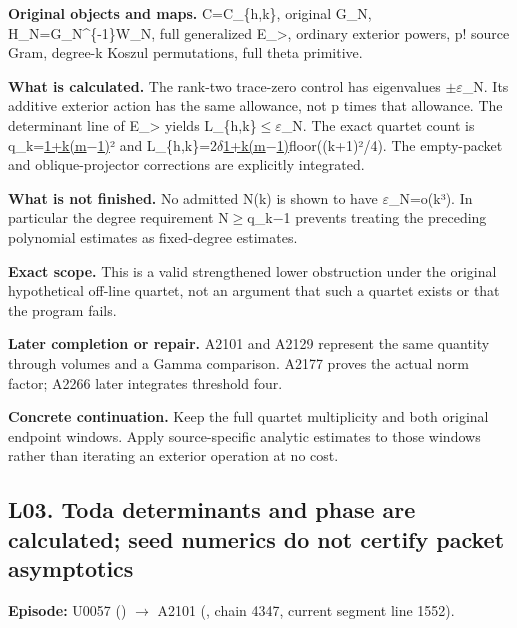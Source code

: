 \textbf{Original objects and maps.} C=C\_\{h,k\}, original G\_N,
H\_N=G\_N\^{}\{-1\}W\_N, full generalized E\_\textgreater, ordinary
exterior powers, p! source Gram, degree-k Koszul permutations, full
theta primitive.

\textbf{What is calculated.} The rank-two trace-zero control has
eigenvalues
\allowbreak{}\ensuremath{±}\allowbreak{}\allowbreak{}\ensuremath{ε}\allowbreak{}\_N.
Its additive exterior action has the same allowance, not p times that
allowance. The determinant line of E\_\textgreater{} yields
L\_\{h,k\}\allowbreak{}\ensuremath{≤}\allowbreak{}\allowbreak{}\ensuremath{ε}\allowbreak{}\_N.
The exact quartet count is
q\_k=\href{k+1}{1+k(m\allowbreak{}\ensuremath{−}\allowbreak{}1)}² and
L\_\{h,k\}=2\allowbreak{}\ensuremath{δ}\allowbreak{}\href{k+1}{1+k(m\allowbreak{}\ensuremath{−}\allowbreak{}1)}floor((k+1)²/4).
The empty-packet and oblique-projector corrections are explicitly
integrated.

\textbf{What is not finished.} No admitted N(k) is shown to have
\allowbreak{}\ensuremath{ε}\allowbreak{}\_N=o(k³). In particular the
degree requirement
N\allowbreak{}\ensuremath{≥}\allowbreak{}q\_k\allowbreak{}\ensuremath{−}\allowbreak{}1
prevents treating the preceding polynomial estimates as fixed-degree
estimates.

\textbf{Exact scope.} This is a valid strengthened lower obstruction
under the original hypothetical off-line quartet, not an argument that
such a quartet exists or that the program fails.

\textbf{Later completion or repair.} A2101 and A2129 represent the same
quantity through volumes and a Gamma comparison. A2177 proves the actual
norm factor; A2266 later integrates threshold four.

\textbf{Concrete continuation.} Keep the full quartet multiplicity and
both original endpoint windows. Apply source-specific analytic estimates
to those windows rather than iterating an exterior operation at no cost.

\subsection{L03. Toda determinants and phase are calculated; seed
numerics do not certify packet
asymptotics}\label{TranscriptLedgerStage:l03.-toda-determinants-and-phase-are-calculated-seed-numerics-do-not-certify-packet-asymptotics}

\textbf{Episode:} U0057
(\protect{})
\allowbreak{}\ensuremath{→}\allowbreak{} A2101
(\protect{}, chain 4347,
current segment line 1552).

